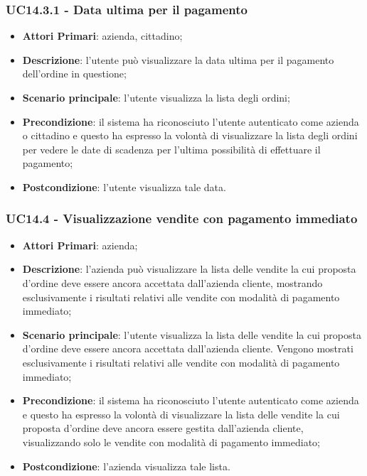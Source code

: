 \subsubsection{UC14.3.1 - Data ultima per il pagamento}
\begin{itemize}
	\item \textbf{Attori Primari}: azienda, cittadino;
	\item \textbf{Descrizione}: l'utente può visualizzare la data ultima per il pagamento dell'ordine in questione;
	\item \textbf{Scenario principale}: l'utente visualizza la lista degli ordini;
	\item \textbf{Precondizione}: il sistema ha riconosciuto l'utente autenticato come azienda o cittadino e questo ha espresso la volontà di visualizzare la lista degli ordini per vedere le date di scadenza per l'ultima possibilità di effettuare il pagamento;
	\item \textbf{Postcondizione}: l'utente visualizza tale data.
\end{itemize}

\subsubsection{UC14.4 - Visualizzazione vendite con pagamento immediato}
\begin{itemize}
	\item \textbf{Attori Primari}: azienda;
	\item \textbf{Descrizione}: l'azienda può visualizzare la lista delle vendite la cui proposta d'ordine deve essere ancora accettata dall'azienda cliente, mostrando esclusivamente i risultati relativi alle vendite con modalità di pagamento immediato;
	\item \textbf{Scenario principale}: l'utente visualizza la lista delle vendite la cui proposta d'ordine deve essere ancora accettata dall'azienda cliente. Vengono mostrati esclusivamente i risultati relativi alle vendite con modalità di pagamento immediato;
	\item \textbf{Precondizione}: il sistema ha riconosciuto l'utente autenticato come azienda e questo ha espresso la volontà di visualizzare la lista delle vendite la cui proposta d'ordine deve ancora essere gestita dall'azienda cliente, visualizzando solo le vendite con modalità di pagamento immediato;
	\item \textbf{Postcondizione}: l'azienda visualizza tale lista.
\end{itemize}


